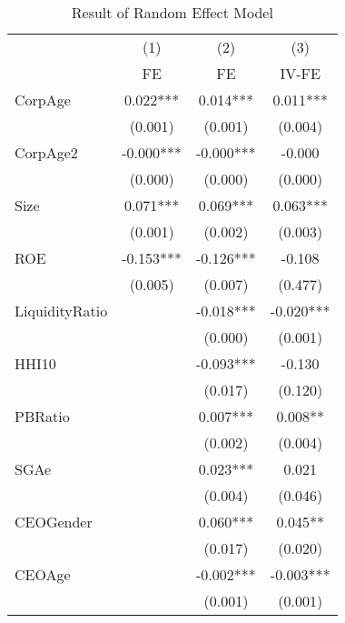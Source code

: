 \begin{table}[htbp]\centering
\def\sym#1{\ifmmode^{#1}\else\(^{#1}\)\fi}
\caption{Result of Random Effect Model \label{tab:regressionRE}}
\begin{tabular}{l*{3}{c}}
\hline\hline
            &\multicolumn{1}{c}{(1)}&\multicolumn{1}{c}{(2)}&\multicolumn{1}{c}{(3)}\\
            &\multicolumn{1}{c}{FE}&\multicolumn{1}{c}{FE}&\multicolumn{1}{c}{IV-FE}\\
\hline
CorpAge     &       0.022***&       0.014***&       0.011***\\
            &     (0.001)   &     (0.001)   &     (0.004)   \\
[1em]
CorpAge2    &      -0.000***&      -0.000***&      -0.000   \\
            &     (0.000)   &     (0.000)   &     (0.000)   \\
[1em]
Size        &       0.071***&       0.069***&       0.063***\\
            &     (0.001)   &     (0.002)   &     (0.003)   \\
[1em]
ROE         &      -0.153***&      -0.126***&      -0.108   \\
            &     (0.005)   &     (0.007)   &     (0.477)   \\
[1em]
LiquidityRatio&               &      -0.018***&      -0.020***\\
            &               &     (0.000)   &     (0.001)   \\
[1em]
HHI10       &               &      -0.093***&      -0.130   \\
            &               &     (0.017)   &     (0.120)   \\
[1em]
PBRatio     &               &       0.007***&       0.008** \\
            &               &     (0.002)   &     (0.004)   \\
[1em]
SGAe        &               &       0.023***&       0.021   \\
            &               &     (0.004)   &     (0.046)   \\
[1em]
CEOGender   &               &       0.060***&       0.045** \\
            &               &     (0.017)   &     (0.020)   \\
[1em]
CEOAge      &               &      -0.002***&      -0.003***\\
            &               &     (0.001)   &     (0.001)   \\

\end{tabular}
\end{table}
